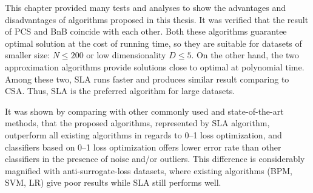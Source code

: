 This chapter provided many tests and analyses to show the advantages
and disadvantages of algorithms proposed in this thesis. It was
verified that the result of PCS and BnB coincide with each other. Both
these algorithms guarantee optimal solution at the cost of running
time, so they are suitable for datasets of smaller size: $N \leq 200$
or low dimensionality $D \leq 5$. On the other hand, the two
approximation algorithms provide solutions close to optimal at
polynomial time. Among these two, SLA runs faster and produces similar
result comparing to CSA. Thus, SLA is the preferred algorithm for
large datasets.

It was shown by comparing with other commonly used and
state-of-the-art methods, that the proposed algorithms, represented by
SLA algorithm, outperform all existing algorithms in regards to 0--1
loss optimization, and classifiers based on 0--1 loss optimization
offers lower error rate than other classifiers in the presence of
noise and/or outliers. This difference is considerably magnified with
anti-surrogate-loss datasets, where existing algorithms (BPM, SVM, LR)
give poor results while SLA still performs well.

